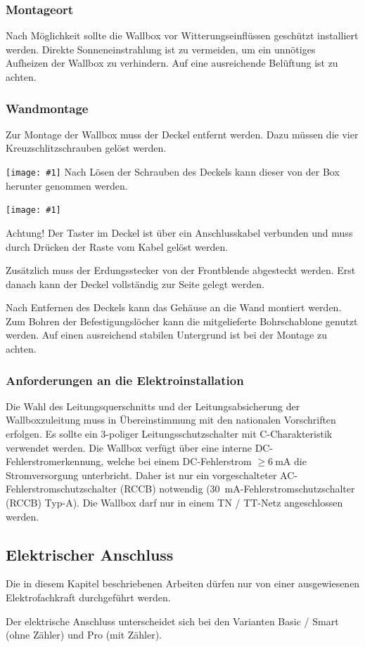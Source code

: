 \documentclass[a4paper,10pt]{article}
\newcommand{\hint}[1]{\begin{tcolorbox}[colback=boxgray,colframe=black,coltext=
white,title=Hinweis]#1\end{tcolorbox}}
\newcommand{\gfx}[1]{\texttt{[image: \#1]}}
\begin{document}
\begin{multicols*}{2}
	\subsubsection{Montageort}
	Nach Möglichkeit sollte die Wallbox vor Witterungseinflüssen geschützt
	installiert werden. Direkte Sonneneinstrahlung ist zu vermeiden, um ein
	unnötiges Aufheizen der Wallbox zu verhindern. Auf eine ausreichende Belüftung
	ist zu achten.

	\subsubsection{Wandmontage}\label{wandmontage}
	Zur Montage der Wallbox muss der Deckel entfernt werden. Dazu müssen die
	vier Kreuzschlitzschrauben gelöst werden.

	\gfx{./img_warp2/resized/warp_screw_points_ready}
	Nach Lösen der Schrauben des Deckels kann dieser von der Box herunter genommen
	werden.

	\gfx{./img_warp2/resized/warp_button_connect_arrow_ready}

	\hint{Achtung! Der Taster im Deckel ist über ein Anschlusskabel verbunden und muss
		durch Drücken der Raste vom Kabel gelöst werden.}
	Zusätzlich muss der Erdungsstecker von der Frontblende abgesteckt werden.
	Erst danach kann der Deckel vollständig zur Seite gelegt werden.

	Nach Entfernen des Deckels kann das Gehäuse an die Wand montiert werden. Zum
	Bohren der Befestigungslöcher kann die mitgelieferte Bohrschablone genutzt
	werden. Auf einen ausreichend stabilen Untergrund ist bei der Montage zu
	achten.

	\subsubsection{Anforderungen an die Elektroinstallation}
	Die Wahl des Leitungsquerschnitts und der Leitungsabsicherung der
	Wallboxzuleitung muss in Übereinstimmung mit den nationalen Vorschriften
	erfolgen. Es sollte ein 3-poliger Leitungsschutzschalter mit C-Charakteristik
	verwendet werden.
	Die Wallbox verfügt über eine interne DC-Fehlerstromerkennung, welche
	bei einem DC-Fehlerstrom $\geq \SI{6}{\milli\ampere}$ die Stromversorgung
	unterbricht. Daher ist nur ein vorgeschalteter AC-Fehlerstromschutzschalter
	(RCCB) notwendig (\SI{30}{\milli\ampere}-Fehlerstromschutzschalter (RCCB) Typ-A).
	Die Wallbox darf nur in einem TN / TT-Netz angeschlossen werden.

	\newpage
	\subsection{Elektrischer Anschluss}
	\hint{Die in diesem Kapitel beschriebenen Arbeiten dürfen nur von einer ausgewiesenen
		Elektrofachkraft durchgeführt werden.}
	Der elektrische Anschluss unterscheidet sich bei den Varianten Basic / Smart
	(ohne Zähler) und Pro (mit Zähler).


\end{multicols*}
\end{document}
